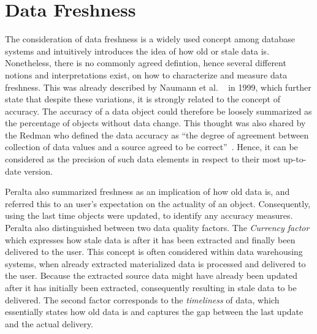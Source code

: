 
\section{Data Freshness}
\label{sec:definition}
The consideration of data freshness is a widely used concept among database systems and intuitively introduces the idea of how old or stale data is.
Nonetheless, there is no commonly agreed defintion, hence several different notions and interpretations exist, on how to characterize and measure data freshness.
This was already described by Naumann et al. ~\cite{naumann:1999} in 1999, which further state that despite these variations, it is strongly related to the concept of accuracy. 
The accuracy of a data object could therefore be loosely summarized as the percentage of objects without data change. 
This thought was also shared by the Redman who defined the data accuracy as ``the degree of agreement between 
collection of data values and a source agreed to be correct''~\cite{redman:1996}.
Hence, it can be considered as the precision of such data elements in respect to their most up-to-date version.



Peralta \cite{peralta:2006} also summarized freshness as an implication of how old data is, and referred this to an user's expectation on the actuality of an object. 
Consequently, using the last time objects were updated, to identify any accuracy measures. Peralta also distinguished between two data quality factors. 
The \emph{Currency factor} which expresses how stale data is after it has been extracted and finally been
delivered to the user. This concept is often considered within data warehousing systems, when already extracted materialized data is processed and delivered to the user.
Because the extracted source data might have already been updated after it has initially been extracted, consequently resulting in stale data to be delivered.
The second factor corresponds to the \emph{timeliness} of data, which essentially states how old data is and captures the gap between the last update and the actual delivery.



